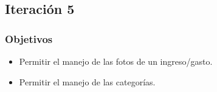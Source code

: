 %
%
%
%

\subsection{Iteración 5}
\subsubsection{Objetivos}
\begin{itemize}
\item Permitir el manejo de las fotos de un ingreso/gasto.
\item Permitir el manejo de las categorías.
\end{itemize}

